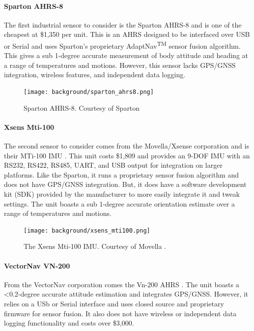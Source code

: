 \paragraph*{Sparton AHRS-8} The first industrial sensor to consider is the Sparton AHRS-8 \cite{Sparton} and is one of the cheapest at \$1,350 per unit.
This is an AHRS designed to be interfaced over USB or Serial and uses Sparton's proprietary AdaptNav\textsuperscript{TM} sensor fusion algorithm.
This gives a sub 1-degree accurate measurement of body attitude and heading at a range of temperatures and motions.
However, this sensor lacks GPS/GNSS integration, wireless features, and independent data logging.

\begin{figure}
    \centering
    \caption[Sparton AHRS-8]{Sparton AHRS-8.
    Courtesy of Sparton \cite{Sparton}}
    \texttt{[image: background/sparton\_ahrs8.png]}
\end{figure}

\paragraph*{Xsens Mti-100} The second sensor to consider comes from the Movella/Xsense corporation and is their MTi-100 IMU \cite{Movella}.
This unit costs \$1,809 and provides an 9-DOF IMU with an RS232, RS422, RS485, UART, and USB output for integration on larger platforms.
Like the Sparton, it runs a proprietary sensor fusion algorithm and does not have GPS/GNSS integration.
But, it does have a software development kit (SDK) provided by the manufacturer to more easily integrate it and tweak settings.
The unit boasts a sub 1-degree accurate orientation estimate over a range of temperatures and motions.

\begin{figure}
    \centering
    \caption[Xsens Mti-100]{The Xsens Mti-100 IMU.
    Courtesy of Movella \cite{Movella}.}
    \texttt{[image: background/xsens\_mti100.png]}
\end{figure}

\paragraph*{VectorNav VN-200} From the VectorNav corporation comes the Vn-200 AHRS \cite{VectorNav:VN200}.
The unit boasts a \textless 0.2-degree accurate attitude estimation and integrates GPS/GNSS.
However, it relies on a USb or Serial interface and uses closed source and proprietary firmware for sensor fusion.
It also does not have wireless or independent data logging functionality and costs over \$3,000.


